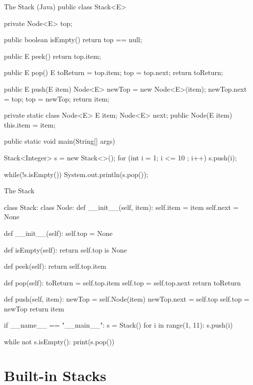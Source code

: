 \begin{javacode}{The Stack (Java)}
public class Stack<E> {
	private Node<E> top;
	
	public boolean isEmpty(){
		return top == null;
	}
	
	public E peek() {
		return top.item;
	}
	
	public E pop() {
		E toReturn =  top.item;
		top = top.next;
		return toReturn;
	}
	
	public E push(E item){
		Node<E> newTop = new Node<E>(item);
		newTop.next = top;
		top = newTop;
		return item;
	}
	
	private static class Node<E>{
		E item;
		Node<E> next;
		public Node(E item) {
			this.item = item;
		}
	}
	
	
	public static void main(String[] args) {
		Stack<Integer> s = new Stack<>();
		for (int i = 1; i <= 10 ; i++) {
			s.push(i);
		}
		
		while(!s.isEmpty()){
			System.out.println(s.pop());
		}
	}
	
}

\end{javacode}





\begin{pycode}{The Stack}
	
class Stack:
	class Node:
		def __init__(self, item):
			self.item = item
			self.next = None
	
	def __init__(self):
		self.top = None
	
	def isEmpty(self):
		return self.top is None
	
	def peek(self):
		return self.top.item
	
	def pop(self):
		toReturn = self.top.item
		self.top = self.top.next
		return toReturn
		
	def push(self, item):
		newTop = self.Node(item)
		newTop.next = self.top
		self.top = newTop
		return item


if __name__ == "__main__":
	s = Stack()
	for i in range(1, 11):
		s.push(i)
	
	while not s.isEmpty():
		print(s.pop())

\end{pycode}


\section{Built-in Stacks}

